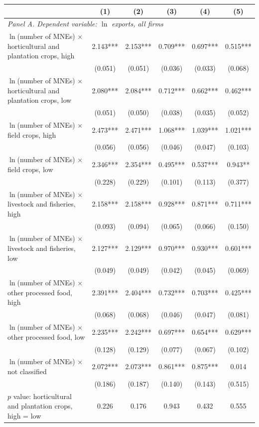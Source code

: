 \begin{tabular}{l*{5}{c}}
\toprule
 & (1) & (2) & (3) & (4) & (5) \\
\midrule
\multicolumn{6}{l}{\textit{Panel A. Dependent variable: $\ln$ exports, all firms}} \\
$\ln$(number of MNEs) $\times$ horticultural and plantation crops, high & 2.143*** & 2.153*** & 0.709*** & 0.697*** & 0.515*** \\
 & (0.051) & (0.051) & (0.036) & (0.033) & (0.068) \\
$\ln$(number of MNEs) $\times$ horticultural and plantation crops, low & 2.080*** & 2.084*** & 0.712*** & 0.662*** & 0.462*** \\
 & (0.051) & (0.050) & (0.038) & (0.035) & (0.052) \\
$\ln$(number of MNEs) $\times$ field crops, high & 2.473*** & 2.471*** & 1.068*** & 1.039*** & 1.021*** \\
 & (0.056) & (0.056) & (0.046) & (0.047) & (0.103) \\
$\ln$(number of MNEs) $\times$ field crops, low & 2.346*** & 2.354*** & 0.495*** & 0.537*** & 0.943** \\
 & (0.228) & (0.229) & (0.101) & (0.113) & (0.377) \\
$\ln$(number of MNEs) $\times$ livestock and fisheries, high & 2.158*** & 2.158*** & 0.928*** & 0.871*** & 0.711*** \\
 & (0.093) & (0.094) & (0.065) & (0.066) & (0.150) \\
$\ln$(number of MNEs) $\times$ livestock and fisheries, low & 2.127*** & 2.129*** & 0.970*** & 0.930*** & 0.601*** \\
 & (0.049) & (0.049) & (0.042) & (0.045) & (0.069) \\
$\ln$(number of MNEs) $\times$ other processed food, high & 2.391*** & 2.404*** & 0.732*** & 0.703*** & 0.425*** \\
 & (0.068) & (0.068) & (0.046) & (0.047) & (0.081) \\
$\ln$(number of MNEs) $\times$ other processed food, low & 2.235*** & 2.242*** & 0.697*** & 0.654*** & 0.629*** \\
 & (0.128) & (0.129) & (0.077) & (0.067) & (0.102) \\
$\ln$(number of MNEs) $\times$ not classified & 2.072*** & 2.073*** & 0.861*** & 0.875*** & 0.014 \\
 & (0.186) & (0.187) & (0.140) & (0.143) & (0.515) \\
$p$ value: horticultural and plantation crops, high = low & 0.226 & 0.176 & 0.943 & 0.432 & 0.555 \\

\end{tabular}
